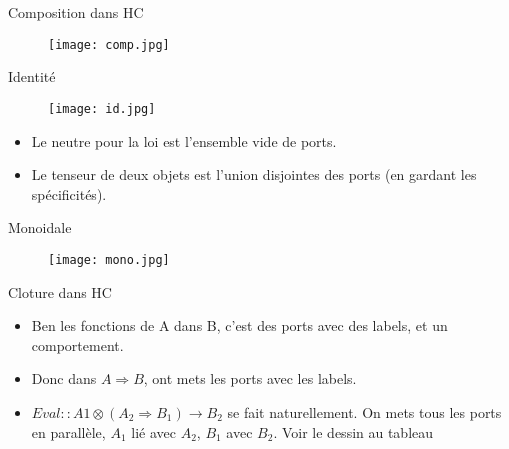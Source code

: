 \documentclass{beamer}
\begin{document}
\begin{frame}{Composition dans HC}

\begin{figure}[h]
\center
\texttt{[image: comp.jpg]}
\end{figure}
\end{frame}

\begin{frame}{Identité}
\begin{figure}[h]
\center
\texttt{[image: id.jpg]}
\end{figure}
\end{frame}

\begin{frame}
\begin{itemize}
\item Le neutre pour la loi est l'ensemble vide de ports.
\item Le tenseur de deux objets est l'union disjointes des ports (en gardant les
spécificités). 
\end{itemize}
\end{frame}

\begin{frame}{Monoidale}
\begin{figure}[h]
\center
\texttt{[image: mono.jpg]}
\end{figure}

\end{frame}



\begin{frame}{Cloture dans HC}
\begin{itemize}
\item Ben les fonctions de A dans B, c'est des ports avec des labels, et un
comportement.
\pause
\item Donc dans $A\Rightarrow B$, ont mets les ports avec les labels.
\item $Eval::A1\otimes(A_2\Rightarrow B_1)\rightarrow B_2$ se fait
naturellement. On mets tous les ports en parallèle, $A_1$ lié avec $A_2$, $B_1$
avec $B_2$. Voir le dessin au tableau
\end{itemize}
\end{frame}
\end{document}
